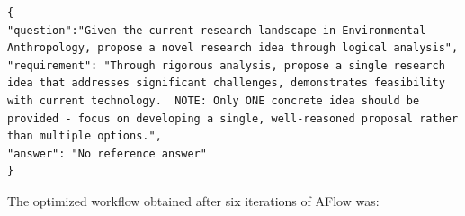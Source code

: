 \documentclass{article} %
\newcommand{\model}{{\sc AFlow}\xspace}
\theoremstyle{plain}
\theoremstyle{definition}
\theoremstyle{remark}
\begin{document}
\begin{tcolorbox}[title={\textbf{\small Idea data}}, boxrule=2pt, arc=0mm, breakable]\begin{verbatim}
{
"question":"Given the current research landscape in Environmental Anthropology, propose a novel research idea through logical analysis",
"requirement": "Through rigorous analysis, propose a single research idea that addresses significant challenges, demonstrates feasibility with current technology.  NOTE: Only ONE concrete idea should be provided - focus on developing a single, well-reasoned proposal rather than multiple options.",
"answer": "No reference answer"
}
\end{verbatim}
\end{tcolorbox}
The optimized workflow obtained after six iterations of \model was:

\label{appendix:Idea generation workflow}
\end{document}
